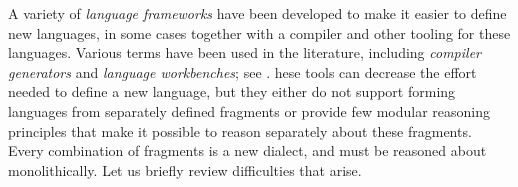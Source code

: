 \documentclass[9pt,preprint]{sigplanconf}
\begin{document}
A variety of \emph{language frameworks} have been developed to make it easier to define new languages, in some cases together with a compiler and other tooling for these languages. Various terms have been used in the literature, including \emph{compiler generators} and \emph{language workbenches}; see \cite{erdweg2013state}. %
hese tools can decrease the effort needed to define a new language, but they either do not support forming languages from separately defined fragments or provide few modular reasoning principles that make it possible to reason separately about these fragments. Every combination of fragments is a new dialect, and must be reasoned about monolithically. %
Let us briefly review difficulties that arise. 
\end{document}
